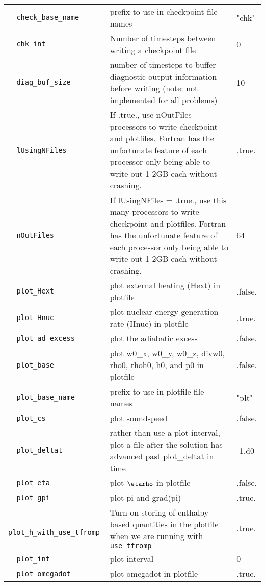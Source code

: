 \begin{landscape}
{\begin{center}
\begin{longtable}{|l|p{5.25in}|l|}
\rowcolor{tableShade}
\verb=  check_base_name  = &   prefix to use in checkpoint file names  &  "chk" \\
\verb=  chk_int  = &   Number of timesteps between writing a checkpoint file  &  0 \\
\rowcolor{tableShade}
\verb=  diag_buf_size  = &   number of timesteps to buffer diagnostic output information before writing (note: not implemented for all problems)  &  10 \\
\verb=  lUsingNFiles  = &   If .true., use nOutFiles processors to write checkpoint and plotfiles. Fortran has the unfortunate feature of each processor only being able to write out 1-2GB each without crashing.  &  .true. \\
\rowcolor{tableShade}
\verb=  nOutFiles  = &   If lUsingNFiles = .true., use this many processors to write checkpoint and plotfiles.  Fortran has the unfortunate feature of each processor only being able to write out 1-2GB each without crashing.  &  64 \\
\verb=  plot_Hext  = &   plot external heating (Hext) in plotfile  &  .false. \\
\rowcolor{tableShade}
\verb=  plot_Hnuc  = &   plot nuclear energy generation rate (Hnuc) in plotfile  &  .true. \\
\verb=  plot_ad_excess  = &   plot the adiabatic excess  &  .false. \\
\rowcolor{tableShade}
\verb=  plot_base  = &   plot w0\_x, w0\_y, w0\_z, divw0, rho0, rhoh0, h0, and p0 in plotfile  &  .false. \\
\verb=  plot_base_name  = &   prefix to use in plotfile file names  &  "plt" \\
\rowcolor{tableShade}
\verb=  plot_cs  = &   plot soundspeed  &  .false. \\
\verb=  plot_deltat  = &   rather than use a plot interval, plot a file after the solution has advanced past plot\_deltat in time  &  -1.d0 \\
\rowcolor{tableShade}
\verb=  plot_eta  = &   plot $\etarho$ in plotfile  &  .false. \\
\verb=  plot_gpi  = &   plot pi and grad(pi)  &  .true. \\
\rowcolor{tableShade}
\verb=  plot_h_with_use_tfromp  = &   Turn on storing of enthalpy-based quantities in the plotfile when we are running with {\tt use\_tfromp}  &  .true. \\
\verb=  plot_int  = &   plot interval  &  0 \\
\rowcolor{tableShade}
\verb=  plot_omegadot  = &   plot omegadot in plotfile  &  .true. \\

\end{longtable}
\end{center}}
\end{landscape}
